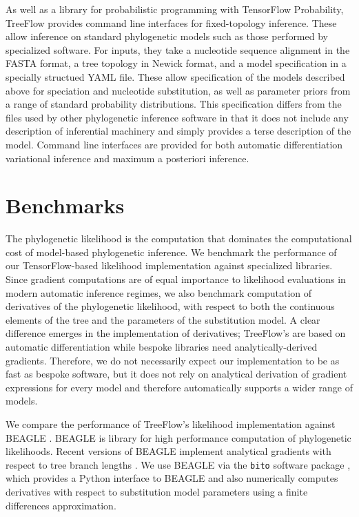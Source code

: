 As well as a library for probabilistic programming with TensorFlow Probability, TreeFlow provides command line interfaces for fixed-topology inference. These allow inference on standard phylogenetic models such as those performed by specialized software. For inputs, they take a nucleotide sequence alignment in the FASTA format, a tree topology in Newick format, and a model specification in a specially structued YAML file. These allow specification of the models described above for speciation and nucleotide substitution, as well as parameter priors from a range of standard probability distributions. This specification differs from the files used by other phylogenetic inference software \cite{drummond2007beast, hohna2016revbayes} in that it does not include any description of inferential machinery and simply provides a terse description of the model. Command line interfaces are provided for both automatic differentiation variational inference and maximum a posteriori inference.

\section{Benchmarks}

The phylogenetic likelihood is the computation that dominates the computational cost of model-based phylogenetic inference. We benchmark the performance of our TensorFlow-based likelihood implementation against specialized libraries. Since gradient computations are of equal importance to likelihood evaluations in modern automatic inference regimes, we also benchmark computation of derivatives of the phylogenetic likelihood, with respect to both the continuous elements of the tree and the parameters of the substitution model. A clear difference emerges in the implementation of derivatives; TreeFlow's are based on automatic differentiation while bespoke libraries need analytically-derived gradients. Therefore, we do not necessarily expect our implementation to be as fast as bespoke software, but it does not rely on analytical derivation of gradient expressions for every model and therefore automatically supports a wider range of models.

We compare the performance of TreeFlow's likelihood implementation against BEAGLE \cite{ayres2019beagle}. BEAGLE is library for high performance computation of phylogenetic likelihoods. Recent versions of BEAGLE implement analytical gradients with respect to tree branch lengths \cite{ji2020gradients}. We use BEAGLE via the \texttt{bito} software package \cite{bito}, which provides a Python interface to BEAGLE and also numerically computes derivatives with respect to substitution model parameters using a finite differences approximation.

